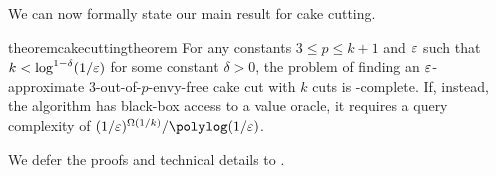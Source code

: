 We can now formally state our main result for cake cutting.
\begin{restatable}{theorem}{cakecuttingtheorem}\label{thm:cake-main}
For any constants $3 \le p \le k+1$ and $\varepsilon$ such that $k < \log^{1-\delta}(1/\varepsilon)$ for some constant $\delta > 0$, the problem of finding an $\varepsilon$-approximate $3$-out-of-$p$-envy-free cake cut with $k$ cuts is \PPAD-complete. If, instead, the algorithm has black-box access to a value oracle, it requires a query complexity of $(1/\eps)^{\Omega(1/k)} / \polylog(1/\eps)$.
\end{restatable}


We defer the proofs and technical details to .